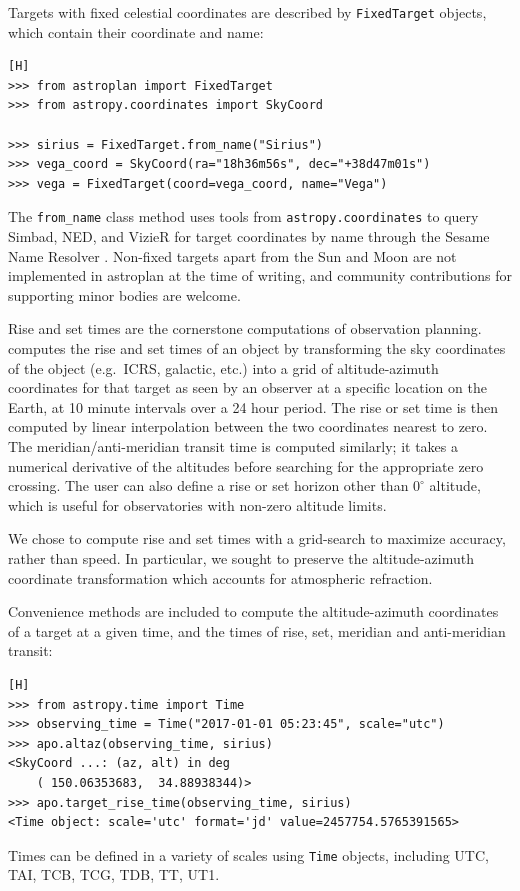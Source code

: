 Targets with fixed celestial coordinates are described by \texttt{FixedTarget} objects, which contain their coordinate and name:
\begin{lstlisting}[caption=Define a fixed celestial target][H]
>>> from astroplan import FixedTarget
>>> from astropy.coordinates import SkyCoord

>>> sirius = FixedTarget.from_name("Sirius")
>>> vega_coord = SkyCoord(ra="18h36m56s", dec="+38d47m01s")
>>> vega = FixedTarget(coord=vega_coord, name="Vega")
\end{lstlisting}
The \texttt{from\_name} class method uses tools from \texttt{astropy.coordinates} to query Simbad, NED, and VizieR for target coordinates by name through the Sesame Name Resolver \citep{Schaaff2004}. Non-fixed targets apart from the Sun and Moon are not implemented in astroplan at the time of writing, and community contributions for supporting minor bodies are welcome.

Rise and set times are the cornerstone computations of observation planning. \astroplan computes the rise and set times of an object by transforming the sky coordinates of the object (e.g.~ICRS, galactic, etc.) into a grid of altitude-azimuth coordinates for that target as seen by an observer at a specific location on the Earth, at 10 minute intervals over a 24 hour period. The rise or set time is then computed by linear interpolation between the two coordinates nearest to zero. The meridian/anti-meridian transit time is computed similarly; it takes a numerical derivative of the altitudes before searching for the appropriate zero crossing. The user can also define a rise or set horizon other than $0^\circ$ altitude, which is useful for observatories with non-zero altitude limits. 

We chose to compute rise and set times with a grid-search to maximize accuracy, rather than speed. In particular, we sought to preserve the \astropy altitude-azimuth coordinate transformation which accounts for atmospheric refraction. 

Convenience methods are included to compute the altitude-azimuth coordinates of a target at a given time, and the times of rise, set, meridian and anti-meridian transit:
\begin{lstlisting}[caption=Find target altitude/azimuth and rise time][H]
>>> from astropy.time import Time
>>> observing_time = Time("2017-01-01 05:23:45", scale="utc")
>>> apo.altaz(observing_time, sirius)
<SkyCoord ...: (az, alt) in deg
    ( 150.06353683,  34.88938344)>
>>> apo.target_rise_time(observing_time, sirius)
<Time object: scale='utc' format='jd' value=2457754.5765391565>
\end{lstlisting}
Times can be defined in a variety of scales using \astropy \texttt{Time} objects, including UTC, TAI, TCB, TCG, TDB, TT, UT1.

